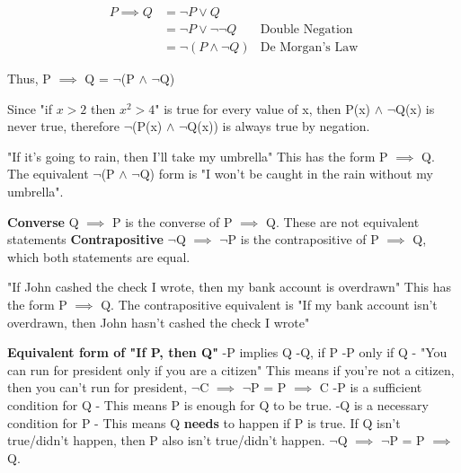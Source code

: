 \documentclass[11pt]{article}
\theoremstyle{definition}
\theoremstyle{remark}
\begin{document}
\begin{align*}
    P \implies Q &= \neg P \lor Q &\\
    &= \neg P \lor \neg \neg Q & \text{Double Negation}\\
    &= \neg(P \land \neg Q) & \text{De Morgan's Law}
\end{align*}
\begin{center}
    Thus, P $\implies$ Q = $\neg$(P $\land$ $\neg$Q) 
\end{center}

Since "if $x>2$ then $x^2 > 4$" is true for every value of x, then P(x) $\land$ $\neg$Q(x) is never true, therefore
$\neg$(P(x) $\land$ $\neg$Q(x)) is always true by negation.

"If it's going to rain, then I'll take my umbrella" This has the form P $\implies$ Q.\newline
The equivalent $\neg$(P $\land$ $\neg$Q) form is "I won't be caught in the rain without my umbrella".

\begin{shaded}
    \textbf{Converse}\newline
    Q $\implies$ P is the converse of P $\implies$ Q. These are not equivalent statements\newline
    \textbf{Contrapositive}\newline
    $\neg$Q $\implies$ $\neg$P is the contrapositive of P $\implies$ Q, which both statements are equal.    
\end{shaded}

"If John cashed the check I wrote, then my bank account is overdrawn" This has the form P $\implies$ Q.\newline
The contrapositive equivalent is "If my bank account isn't overdrawn, then John hasn't cashed the check I wrote"

\begin{shaded}
    \textbf{Equivalent form of "If P, then Q"}\newline
    -P implies Q\newline
    -Q, if P\newline
    -P only if Q - "You can run for president only if you are a citizen" This means if you're not a citizen,
    then you can't run for president, $\neg$C $\implies$ $\neg$P = P $\implies$ C\newline
    -P is a sufficient condition for Q - This means P is enough for Q to be true.\newline
    -Q is a necessary condition for P - This means Q \textbf{needs} to happen if P is true. If Q isn't true/didn't happen,
    then P also isn't true/didn't happen. $\neg$Q $\implies$ $\neg$P = P $\implies$ Q.     
\end{shaded}
\end{document}
